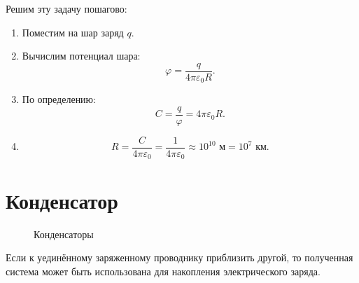     \begin{solution}
        Решим эту задачу пошагово:
        \begin{enumerate}
            \item Поместим на шар заряд \( q \).
            \item Вычислим потенциал шара:
                \[
                    \varphi = \frac{q}{4\pi\varepsilon_0 R}.
                \]
            \item По определению:
                \[
                    C = \frac{q}{\varphi} = 4\pi\varepsilon_0 R.
                \]
            \item
                \[
                    R = \frac{C}{4\pi\varepsilon_0} =
                    \frac{1}{4\pi\varepsilon_0} \approx 10^10 \text{ м} =
                    10^7 \text{ км}.
                \]
        \end{enumerate}
        \end{solution}

\section{Конденсатор}
    \begin{figure}[b!]
    \center
    \hfill
    \caption{Конденсаторы}
    \end{figure}


    Если к уединённому заряженному проводнику приблизить другой, то полученная 
    система может быть использована для накопления электрического заряда.

